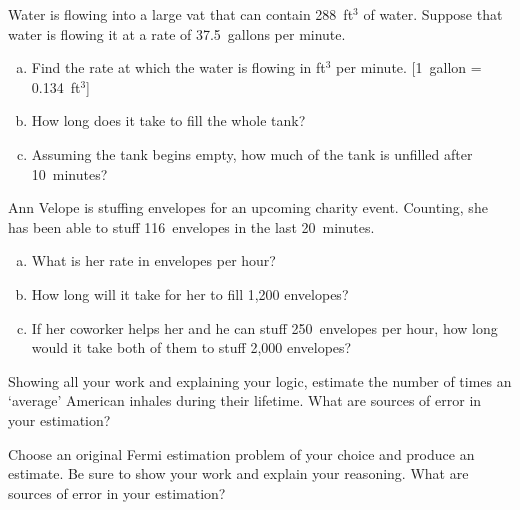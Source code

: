 \documentclass[11pt,letterpaper]{article}
\begin{document}

 Water is flowing into a large vat that can contain 288~ft$^3$ of water. Suppose that water is flowing it at a rate of 37.5~gallons per minute. 
	\begin{enumerate}[(a)]
	\item Find the rate at which the water is flowing in ft$^3$ per minute. [1~gallon = 0.134~ft$^3$]
	\item How long does it take to fill the whole tank?
	\item Assuming the tank begins empty, how much of the tank is unfilled after 10~minutes?
	\end{enumerate}



\newpage



 Ann Velope is stuffing envelopes for an upcoming charity event. Counting, she has been able to stuff 116~envelopes in the last 20~minutes. 
	\begin{enumerate}[(a)]
	\item What is her rate in envelopes per hour?
	\item How long will it take for her to fill 1,200 envelopes? 
	\item If her coworker helps her and he can stuff 250~envelopes per hour, how long would it take both of them to stuff 2,000 envelopes? 
	\end{enumerate}



\newpage



 Showing all your work and explaining your logic, estimate the number of times an `average' American inhales during their lifetime. What are sources of error in your estimation? 



\newpage



 Choose an original Fermi estimation problem of your choice and produce an estimate. Be sure to show your work and explain your reasoning. What are sources of error in your estimation?
\end{document}
